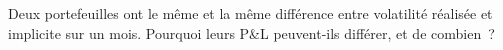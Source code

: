 \begin{interviewq}\label{iq:dv:greeks-and-the-hedging-pnl:6}
Deux portefeuilles ont le même  et la même différence entre volatilité réalisée et implicite sur un
mois. Pourquoi leurs P\&L peuvent-ils différer, et de combien~?
\end{interviewq}
